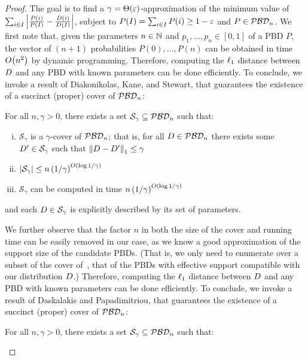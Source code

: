 \begin{proof}
The goal is to find a $\gamma = \Theta(\eps)$-approximation of the minimum value of $\sum_{i\in I}\abs{\frac{P(i)}{P(I)} - \frac{\D(i)}{\D(I)}}$, subject to $P(I)=\sum_{i\in I} P(i) \geq 1-\eps$ and $P\in\classpbd_n$. We first note that, given the parameters $n \in \N$ and $p_1,\dots,p_n\in[0,1]$ of a PBD $P$, the vector of $(n+1)$ probabilities $P(0),\dots,P(n)$ can be obtained in time $\bigO{n^2}$ by dynamic programming. 
Therefore, computing the $\lp[1]$ distance between $\D$ and any PBD with known parameters can be done efficiently. To conclude, we invoke a result of Diakonikolas, Kane, and Stewart, that guarantees the existence of a succinct (proper) cover of $\classpbd_n$:
\begin{theorem}
  For all $n, \gamma >0$, there exists a set $\mathcal{S}_{\gamma} \subseteq \classpbd_n$ such that:
  \begin{enumerate}[(i)]
  \item $\mathcal{S}_{\gamma}$ is a $\gamma$-cover of $\classpbd_n$; that is, for all $\D \in \classpbd_n$ there exists some $\D^\prime \in \mathcal{S}_{\gamma}$ such that $\normone{\D-\D^\prime} \leq \gamma$
  \item {$\abs{\mathcal{S}_{\gamma}} \leq n \left({1/\gamma}\right)^{\bigO{ \log{1/\gamma}}}$}
  \item $\mathcal{S}_{\gamma}$ can be computed in time {$n\left( {1/\gamma} \right)^{\bigO{\log{1/\gamma}}}$}
  \end{enumerate}
and each $\D\in\mathcal{S}_{\gamma}$  is explicitly described by its set of parameters.
\end{theorem}
\noindent We further observe that the factor $n$ in both the size of the cover and running time can be easily removed in our case, as we know a good approximation of the support size of the candidate PBDs. (That is, we only need to enumerate over a subset of the cover of~\cite{DKS:15}, that of the PBDs with effective support compatible with our distribution $\D$.)
\iffalse
Therefore, computing the $\lp[1]$ distance between $\D$ and any PBD with known parameters can be done efficiently. To conclude, we invoke a result of Daskalakis and Papadimitriou, that guarantees the existence of a succinct (proper) cover of $\classpbd_n$:
\begin{theorem}[{\cite[Theorem 1]{DP:13}}]
  For all $n, \gamma >0$, there exists a set $\mathcal{S}_{\gamma} \subseteq \classpbd_n$ such that:
  \begin{enumerate}[(i)]

\end{enumerate}
\end{theorem}
\end{proof}
